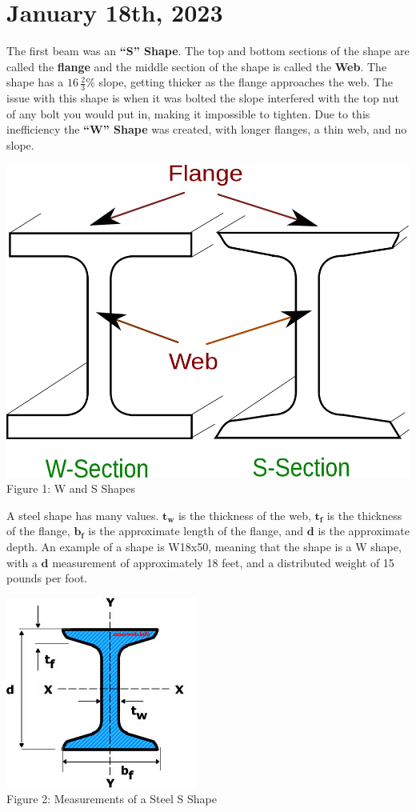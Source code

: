 \documentclass{article}
\begin{document}
\section*{January 18th, 2023}
The first beam was an \textbf{``S'' Shape}. The top and bottom sections of the shape are called the \textbf{flange} and the middle section of the shape is called the \textbf{Web}. The shape has a \(16\,\frac{2}{3}\%\) slope, getting thicker as the flange approaches the web. The issue with this shape is when it was bolted the slope interfered with the top nut of any bolt you would put in, making it impossible to tighten. Due to this inefficiency the \textbf{``W'' Shape} was created, with longer flanges, a thin web, and no slope.
\begin{center}
    \vspace{3mm}
    \includegraphics[scale=0.2]{fig1.jpg}
    \vspace{3mm}
    \\Figure 1: W and S Shapes
\end{center}
\noindent A steel shape has many values. \(\bm{t_w}\) is the thickness of the web, \(\bm{t_f}\) is the thickness of the flange, \(\bm{b_f}\) is the approximate length of the flange, and \(\bm{d}\) is the approximate depth. An example of a shape is W18x50, meaning that the shape is a W shape, with a \(\bm{d}\) measurement of approximately 18 feet, and a distributed weight of 15 pounds per foot.
\begin{center}
    \vspace{3mm}
    \includegraphics[scale=1]{fig2.jpg}
    \vspace{3mm}
    \\Figure 2: Measurements of a Steel S Shape
\end{center}
\end{document}
